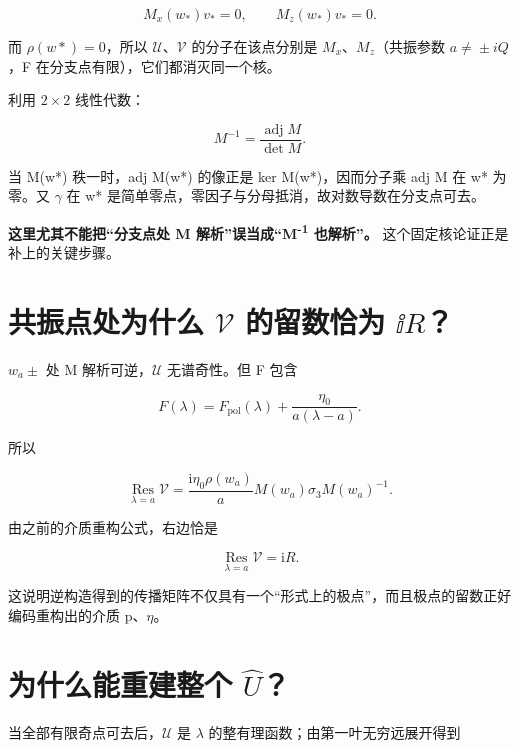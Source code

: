 \[
M_x(w_*)v_*=0,\qquad M_z(w_*)v_*=0.
\]

而 $\rho{}(w*)=0$，所以 $\mathcal U$、$\mathcal V$ 的分子在该点分别是 $M_x$、$M_z$（共振参数 $a\ne{}\pm{}iQ$，F 在分支点有限），它们都消灭同一个核。\par

利用 $2\times{}2$ 线性代数：\par

\[
M^{-1}=\dfrac{\operatorname{adj}M}{\det M}.
\]

当 M(w*) 秩一时，adj M(w*) 的像正是 ker M(w*)，因而分子乘 adj M 在 w* 为零。又 $\gamma{}$ 在 w* 是简单零点，零因子与分母抵消，故对数导数在分支点可去。\par

\textbf{这里尤其不能把“分支点处 M 解析”误当成“M\textsuperscript{-}\textsuperscript{1} 也解析”。} 这个固定核论证正是补上的关键步骤。\par

\section{共振点处为什么 \texorpdfstring{$\mathcal{V}$}{V} 的留数恰为 \texorpdfstring{$\ii R$}{iR}？}

$w_{a}\pm{}$ 处 M 解析可逆，$\mathcal U$ 无谱奇性。但 F 包含\par

\[
F(\lambda)=F_{\mathrm{pol}}(\lambda)
+\dfrac{\eta_0}{a(\lambda-a)}.
\]

所以\par

\[
\operatorname*{Res}_{\lambda=a}\mathcal V
=\dfrac{\mathrm{i}\eta_0\rho(w_a)}{a}
M(w_a)\sigma_3M(w_a)^{-1}.
\]

由之前的介质重构公式，右边恰是\par

\[
\boxed{
\operatorname*{Res}_{\lambda=a}\mathcal V=\mathrm{i}R.
}
\]

这说明逆构造得到的传播矩阵不仅具有一个“形式上的极点”，而且极点的留数正好编码重构出的介质 p、$\eta{}$。\par

\section{为什么能重建整个 \texorpdfstring{$\widehat{U}$}{hat(U)}？}

当全部有限奇点可去后，$\mathcal U$ 是 $\lambda{}$ 的整有理函数；由第一叶无穷远展开得到\par

